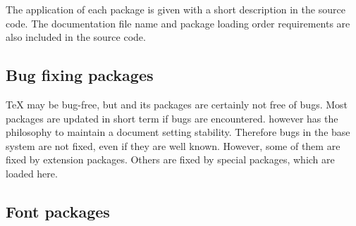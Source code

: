 
The application of each package is given with a short description in the source code. The documentation file name and package loading order requirements are also included in the source code. 


\subsection{Bug fixing packages}
\label{sec:packages:bugfix}

\TeX{} may be bug-free, but \latex and its packages are certainly not free of bugs.  Most packages are updated in short term if bugs are encountered. \latex however has the philosophy to maintain a document setting stability. Therefore bugs in the base \latex system are not fixed, even if they are well known. However, some of them are fixed by extension packages. Others are fixed by special packages, which are loaded here.



\subsection{Font packages}
\label{sec:packages:fonts}

